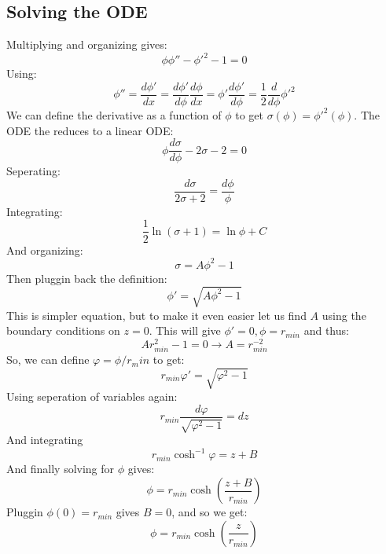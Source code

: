 \documentclass{article}
\begin{document}
\subsection{Solving the ODE}
Multiplying and organizing gives:
\begin{equation}
    \phi\phi'' - \phi'^2 - 1 = 0
\end{equation}
Using:
\begin{equation}
    \phi'' = \frac{d\phi'}{dx} = \frac{d\phi'}{d\phi}\frac{d\phi}{dx} = \phi'\frac{d\phi'}{d\phi} = \frac{1}{2}\frac{d}{d\phi}\phi'^2
\end{equation}
We can define the derivative as a function of $\phi$ to get $\sigma(\phi) = \phi'^2(\phi)$. The ODE the reduces to a linear ODE:
\begin{equation}
    \phi\frac{d\sigma}{d\phi} - 2\sigma - 2 = 0
\end{equation}
Seperating:
\begin{equation}
    \frac{d\sigma}{2\sigma + 2} = \frac{d\phi}{\phi}
\end{equation}
Integrating:
\begin{equation}
    \frac{1}{2}\ln(\sigma + 1) = \ln\phi + C
\end{equation}
And organizing:
\begin{equation}
    \sigma = A \phi^2 - 1
\end{equation}
Then pluggin back the definition:
\begin{equation}
    \phi' = \sqrt{A\phi^2 - 1}
\end{equation}
This is simpler equation, but to make it even easier let us find $A$ using the boundary conditions on $z = 0$. This will give $\phi' = 0, \phi = r_{min}$ and thus:
\begin{equation}
    Ar_{min}^2 - 1 = 0 \rightarrow A = r_{min}^{-2}
\end{equation}
So, we can define $\varphi = \phi/r_min$ to get:
\begin{equation}
    r_{min}\varphi' = \sqrt{\varphi^2 - 1}
\end{equation}
Using seperation of variables again:
\begin{equation}
    r_{min}\frac{d\varphi}{\sqrt{\varphi^2 - 1}} = dz
\end{equation}
And integrating
\begin{equation}
    r_{min} \cosh^{-1}\varphi = z + B
\end{equation}
And finally solving for $\phi$ gives:
\begin{equation}
    \phi = r_{min}\cosh(\frac{z + B}{r_{min}})
\end{equation}
Pluggin $\phi(0) = r_{min}$ gives $B = 0$, and so we get:
\begin{equation}
    \boxed{\phi = r_{min}\cosh(\frac{z}{r_{min}})}
\end{equation}
\end{document}
